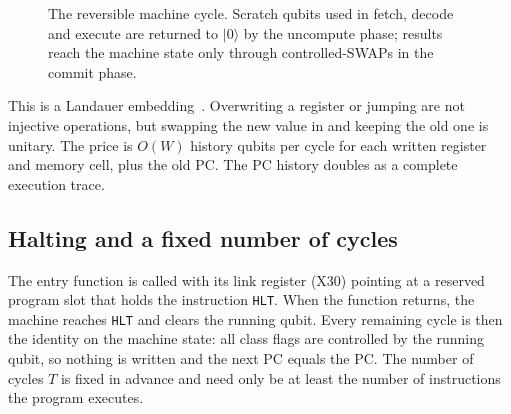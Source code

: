 \documentclass[11pt]{article}
\begin{document}
\begin{figure}[H]
\centering
{}
\caption{The reversible machine cycle. Scratch qubits used in fetch, decode and execute are
returned to $|0\rangle$ by the uncompute phase; results reach the machine state only
through controlled-SWAPs in the commit phase.}
\label{fig:cycle}
\end{figure}

This is a Landauer embedding~\cite{landauer1961,bennett1973}. Overwriting a register or
jumping are not injective operations, but swapping the new value in and keeping the old one
is unitary. The price is $O(W)$ history qubits per cycle for each written register and memory
cell, plus the old PC. The PC history doubles as a complete execution trace.

\subsection{Halting and a fixed number of cycles}
\label{sec:halt}

The entry function is called with its link register (X30) pointing at a reserved program slot that
holds the instruction \texttt{HLT}. When the function returns, the machine reaches \texttt{HLT} and
clears the running qubit. Every remaining cycle is then the identity on the machine state: all class
flags are controlled by the running qubit, so nothing is written and the next PC equals the PC. The
number of cycles $T$ is fixed in advance and need only be at least the number of instructions the
program executes.
\end{document}
